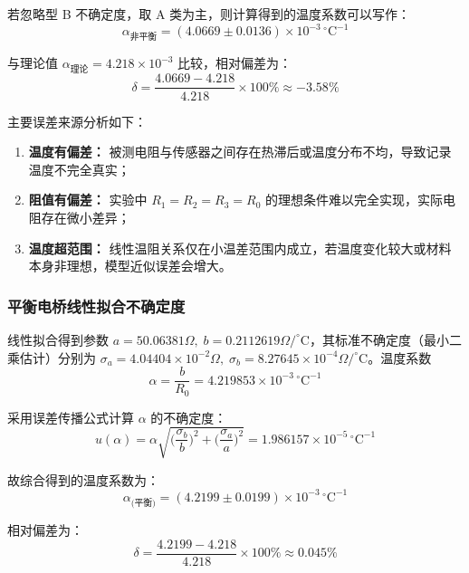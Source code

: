 \documentclass[]{../template/Report}%
\begin{document}
\begin{fullreportonly}
若忽略型 B 不确定度，取 A 类为主，则计算得到的温度系数可以写作：
\begin{equation}
\boxed{\alpha_{\text{非平衡}}=(4.0669\pm0.0136)\times10^{-3}\,^{\circ}\mathrm{C}^{-1}}
\end{equation}

与理论值 $\alpha_{\text{理论}}=4.218\times10^{-3}$ 比较，相对偏差为：
\begin{equation}
\delta=\frac{4.0669-4.218}{4.218}\times100\%\approx -3.58\%
\end{equation}
\vspace{1mm}

主要误差来源分析如下：
\begin{enumerate}
    \item \textbf{温度有偏差：} 被测电阻与传感器之间存在热滞后或温度分布不均，导致记录温度不完全真实；
    \item \textbf{阻值有偏差：} 实验中 $R_1=R_2=R_3=R_0$ 的理想条件难以完全实现，实际电阻存在微小差异；
    \item \textbf{温度超范围：} 线性温阻关系仅在小温差范围内成立，若温度变化较大或材料本身非理想，模型近似误差会增大。
\end{enumerate}

\subsubsection{平衡电桥线性拟合不确定度}
线性拟合得到参数 $a=50.06381\Omega,\;b=0.2112619\Omega/^{\circ}\mathrm{C}$，其标准不确定度（最小二乘估计）分别为 $\sigma_a=4.04404\times10^{-2}\Omega,\;\sigma_b=8.27645\times10^{-4}\Omega/^{\circ}\mathrm{C}$。温度系数
\begin{equation}
\alpha=\frac{b}{R_0}=4.219853\times10^{-3}\,^{\circ}\mathrm{C}^{-1}
\end{equation}

采用误差传播公式计算 $\alpha$ 的不确定度：
\begin{equation}
u(\alpha)=\alpha\sqrt{\Big(\frac{\sigma_b}{b}\Big)^2+\Big(\frac{\sigma_a}{a}\Big)^2}=1.986157\times10^{-5}\,^{\circ}\mathrm{C}^{-1}
\end{equation}

故综合得到的温度系数为：
\begin{equation}
\boxed{\alpha_{\text{(平衡)}}=(4.2199\pm0.0199)\times10^{-3}\,^{\circ}\mathrm{C}^{-1}}
\end{equation}

相对偏差为：
\begin{equation}
\delta=\frac{4.2199-4.218}{4.218}\times100\%\approx 0.045\%
\end{equation}


\end{fullreportonly}
\end{document}
